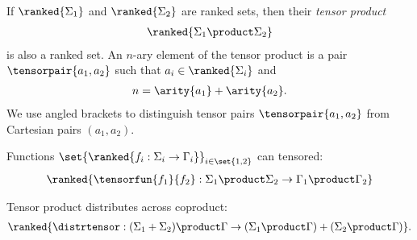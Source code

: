 \datatypefigure
{
If $\ranked{\Sigma_1}$ and $\ranked{\Sigma_2}$ are ranked sets, then  their \emph{tensor product}
\begin{align*}
    \ranked{\Sigma_1 \product \Sigma_2}
\end{align*}
is also a ranked set. An $n$-ary element of the tensor product is a pair $\tensorpair {a_1,a_2}$ such that $a_i \in \ranked{\Sigma_i}$ and 
\begin{align*}
    n = \arity{a_1} + \arity{a_2}.
\end{align*}
We use angled brackets to distinguish tensor pairs $\tensorpair{a_1,a_2}$ from Cartesian pairs $(a_1,a_2)$. 
}
{
       \item Functions $\set{\ranked{f_i : \Sigma_i \to \Gamma_i}}_{i \in \set{1,2}}$ can tensored: 
       \begin{align*}
           \ranked{\tensorfun{f_1}{f_2} : \Sigma_1 \product \Sigma_2 \to  \Gamma_1 \product \Gamma_2}
       \end{align*}
       \item Tensor  product distributes across coproduct:
       \begin{align*}
           \ranked{\distrtensor : (\Sigma_1 + \Sigma_2)\product \Gamma \to (\Sigma_1 \product \Gamma) + (\Sigma_2 \product \Gamma)}.
       \end{align*} 
}

